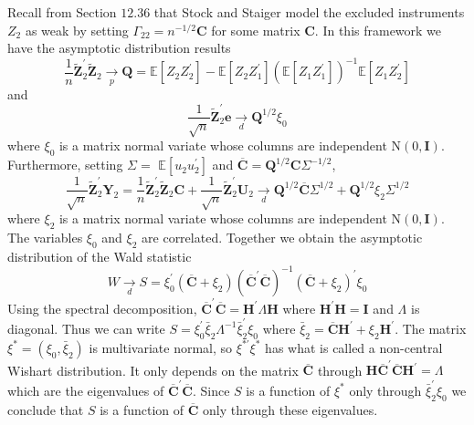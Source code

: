 \documentclass[10pt]{article}
\begin{document}
Recall from Section $12.36$ that Stock and Staiger model the excluded instruments $Z_{2}$ as weak by setting $\Gamma_{22}=n^{-1 / 2} \boldsymbol{C}$ for some matrix $\boldsymbol{C}$. In this framework we have the asymptotic distribution results
$$
\frac{1}{n} \widetilde{\boldsymbol{Z}}_{2}^{\prime} \widetilde{\boldsymbol{Z}}_{2} \underset{p}{\longrightarrow} \boldsymbol{Q}=\mathbb{E}\left[Z_{2} Z_{2}^{\prime}\right]-\mathbb{E}\left[Z_{2} Z_{1}^{\prime}\right]\left(\mathbb{E}\left[Z_{1} Z_{1}^{\prime}\right]\right)^{-1} \mathbb{E}\left[Z_{1} Z_{2}^{\prime}\right]
$$
and
$$
\frac{1}{\sqrt{n}} \widetilde{\boldsymbol{Z}}_{2}^{\prime} \boldsymbol{e} \underset{d}{\longrightarrow} \boldsymbol{Q}^{1 / 2} \xi_{0}
$$
where $\xi_{0}$ is a matrix normal variate whose columns are independent $\mathrm{N}(0, \boldsymbol{I})$. Furthermore, setting $\Sigma=$ $\mathbb{E}\left[u_{2} u_{2}^{\prime}\right]$ and $\overline{\boldsymbol{C}}=\boldsymbol{Q}^{1 / 2} \boldsymbol{C} \Sigma^{-1 / 2}$,
$$
\frac{1}{\sqrt{n}} \widetilde{\boldsymbol{Z}}_{2}^{\prime} \boldsymbol{Y}_{2}=\frac{1}{n} \widetilde{\boldsymbol{Z}}_{2}^{\prime} \widetilde{\boldsymbol{Z}}_{2} \boldsymbol{C}+\frac{1}{\sqrt{n}} \widetilde{\boldsymbol{Z}}_{2}^{\prime} \boldsymbol{U}_{2} \underset{d}{\longrightarrow} \boldsymbol{Q}^{1 / 2} \overline{\boldsymbol{C}} \Sigma^{1 / 2}+\boldsymbol{Q}^{1 / 2} \xi_{2} \Sigma^{1 / 2}
$$
where $\xi_{2}$ is a matrix normal variate whose columns are independent $\mathrm{N}(0, \boldsymbol{I})$. The variables $\xi_{0}$ and $\xi_{2}$ are correlated. Together we obtain the asymptotic distribution of the Wald statistic
$$
W \underset{d}{\longrightarrow} S=\xi_{0}^{\prime}\left(\overline{\boldsymbol{C}}+\xi_{2}\right)\left(\overline{\boldsymbol{C}}^{\prime} \overline{\boldsymbol{C}}\right)^{-1}\left(\overline{\boldsymbol{C}}+\xi_{2}\right)^{\prime} \xi_{0}
$$
Using the spectral decomposition, $\overline{\boldsymbol{C}}^{\prime} \overline{\boldsymbol{C}}=\boldsymbol{H}^{\prime} \Lambda \boldsymbol{H}$ where $\boldsymbol{H}^{\prime} \boldsymbol{H}=\boldsymbol{I}$ and $\Lambda$ is diagonal. Thus we can write $S=\xi_{0}^{\prime} \bar{\xi}_{2} \Lambda^{-1} \bar{\xi}_{2}^{\prime} \xi_{0}$ where $\bar{\xi}_{2}=\overline{\boldsymbol{C}} \boldsymbol{H}^{\prime}+\xi_{2} \boldsymbol{H}^{\prime}$. The matrix $\xi^{*}=\left(\xi_{0}, \bar{\xi}_{2}\right)$ is multivariate normal, so $\xi^{* \prime} \xi^{*}$ has what is called a non-central Wishart distribution. It only depends on the matrix $\overline{\boldsymbol{C}}$ through $\boldsymbol{H} \overline{\boldsymbol{C}}^{\prime} \overline{\boldsymbol{C}} \boldsymbol{H}^{\prime}=\Lambda$ which are the eigenvalues of $\overline{\boldsymbol{C}}^{\prime} \overline{\boldsymbol{C}}$. Since $S$ is a function of $\xi^{*}$ only through $\bar{\xi}_{2}^{\prime} \xi_{0}$ we conclude that $S$ is a function of $\overline{\boldsymbol{C}}$ only through these eigenvalues.
\end{document}
